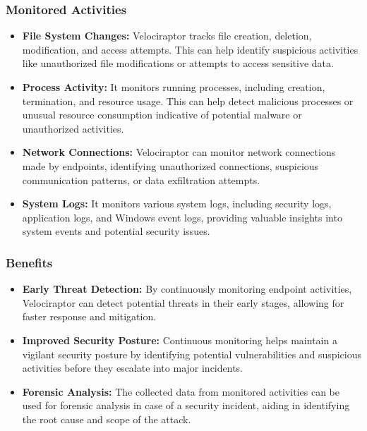 \documentclass[a4paper, 11pt, oneside]{article} %
\begin{document}
\subsubsection{Monitored Activities}

\begin{itemize}
    \item \textbf{File System Changes: }Velociraptor tracks file creation, deletion, modification, and access attempts. This can help identify suspicious activities like unauthorized file modifications or attempts to access sensitive data.
    \item \textbf{Process Activity: } It monitors running processes, including creation, termination, and resource usage. This can help detect malicious processes or unusual resource consumption indicative of potential malware or unauthorized activities.
    \item \textbf{Network Connections: }Velociraptor can monitor network connections made by endpoints, identifying unauthorized connections, suspicious communication patterns, or data exfiltration attempts.
    \item \textbf{System Logs: }It monitors various system logs, including security logs, application logs, and Windows event logs, providing valuable insights into system events and potential security issues.
\end{itemize}
\subsubsection{Benefits}
\begin{itemize}
    \item \textbf{Early Threat Detection: } By continuously monitoring endpoint activities, Velociraptor can detect potential threats in their early stages, allowing for faster response and mitigation.
    \item \textbf{Improved Security Posture: } Continuous monitoring helps maintain a vigilant security posture by identifying potential vulnerabilities and suspicious activities before they escalate into major incidents.
    \item \textbf{Forensic Analysis: }The collected data from monitored activities can be used for forensic analysis in case of a security incident, aiding in identifying the root cause and scope of the attack.
\end{itemize}
\end{document}
